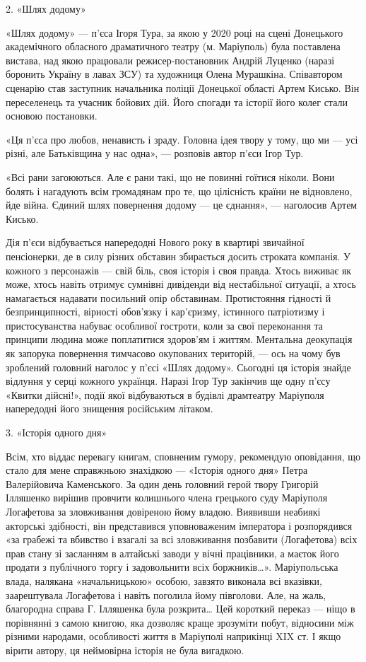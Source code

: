 2. «Шлях додому» 

«Шлях додому» — п'єса Ігоря Тура, за якою у 2020 році на сцені Донецького
академічного обласного драматичного театру (м. Маріуполь) була поставлена
вистава, над якою працювали режисер-постановник Андрій Луценко (наразі боронить
Україну в лавах ЗСУ) та художниця Олена Мурашкіна. Співавтором сценарію став
заступник начальника поліції Донецької області Артем Кисько. Він переселенець
та учасник бойових дій. Його спогади та історії його колег стали основою
постановки.

«Ця п'єса про любов, ненависть і зраду. Головна ідея твору у тому, що ми — усі
різні, але Батьківщина у нас одна», — розповів автор п'єси Ігор Тур.

«Всі рани загоюються. Але є рани такі, що не повинні гоїтися ніколи. Вони
болять і нагадують всім громадянам про те, що цілісність країни не відновлено,
йде війна. Єдиний шлях повернення додому — це єднання», — наголосив Артем
Кисько.

Дія п'єси відбувається напередодні Нового року в квартирі звичайної
пенсіонерки, де в силу різних обставин збирається досить строката компанія. У
кожного з персонажів — свій біль, своя історія і своя правда. Хтось виживає як
може, хтось навіть отримує сумнівні дивіденди від нестабільної ситуації, а
хтось намагається надавати посильний опір обставинам. Протистояння гідності й
безпринципності, вірності обов’язку і кар'єризму, істинного патріотизму і
пристосуванства набуває особливої гостроти, коли за свої переконання та
принципи людина може поплатитися здоров’ям і життям. Ментальна деокупація як
запорука повернення тимчасово окупованих територій, — ось на чому був зроблений
головний наголос у п'єсі «Шлях додому». Сьогодні ця історія знайде відлуння у
серці кожного українця. Наразі Ігор Тур закінчив ще одну п'єсу «Квитки
дійсні!», події якої відбуваються в будівлі драмтеатру Маріуполя напередодні
його знищення російським літаком.

3. «Історія одного дня» 

Всім, хто віддає перевагу книгам, сповненим гумору, рекомендую оповідання, що
стало для мене справжньою знахідкою — «Історія одного дня» Петра Валерійовича
Каменського. За один день головний герой твору Григорій Ілляшенко вирішив
провчити колишнього члена грецького суду Маріуполя Логафетова за зловживання
довіреною йому владою. Виявивши неабиякі акторські здібності, він представився
уповноваженим імператора і розпорядився «за грабежі та вбивство і взагалі за
всі зловживання позбавити (Логафетова) всіх прав стану зі засланням в алтайські
заводи у вічні працівники, а маєток його продати з публічного торгу і
задовольнити всіх боржників…». Маріупольська влада, налякана «начальницькою»
особою, завзято виконала всі вказівки, заарештувала Логафетова і навіть
поголила йому півголови. Але, на жаль, благородна справа Г. Ілляшенка була
розкрита… Цей короткий переказ — ніщо в порівнянні з самою книгою, яка дозволяє
краще зрозуміти побут, відносини між різними народами, особливості життя в
Маріуполі наприкінці XIX ст. І якщо вірити автору, ця неймовірна історія не
була вигадкою.  

